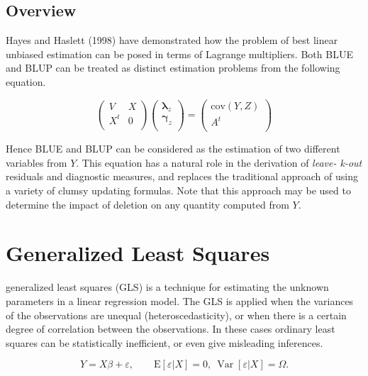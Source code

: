 \documentclass[12pt, a4paper]{article}
\begin{document}
\subsection{Overview}
Hayes and Haslett (1998) have demonstrated how the problem of best linear unbiased estimation can be posed in terms of Lagrange multipliers. Both BLUE and BLUP can be treated as distinct estimation problems from the following equation.

\begin{equation}
\left(  \begin{array}{cc} V & X \\    X^t & 0 \\
\end{array}\right)\left(  \begin{array}{c}    \boldsymbol{\lambda}_{z}\\   \boldsymbol{\gamma}_z \\  \end{array}
\right)=\left(  \begin{array}{c}    \mbox{cov}(Y,Z)\\   A^{t} \\  \end{array}\right)\end{equation}


Hence BLUE and BLUP can be considered as the estimation of two different variables from $Y$. This equation has a natural role in the derivation of \emph{leave- k-out} residuals and diagnostic measures, and replaces the traditional approach of using a variety of clumsy updating formulas. Note that this approach may be used to determine the impact of deletion on any quantity computed from $Y$.




\section{Generalized Least Squares}


generalized least squares (GLS) is a technique for estimating the unknown parameters in a linear regression model. 
The GLS is applied when the variances of the observations are unequal (heteroscedasticity), or when there is a certain degree of correlation between the observations. 
In these cases ordinary least squares can be statistically inefficient, or even give misleading inferences.



\[ Y = X\beta + \varepsilon, \qquad \mathrm{E}[\varepsilon|X]=0,\ \operatorname{Var}[\varepsilon|X]=\Omega.\]
\end{document}
